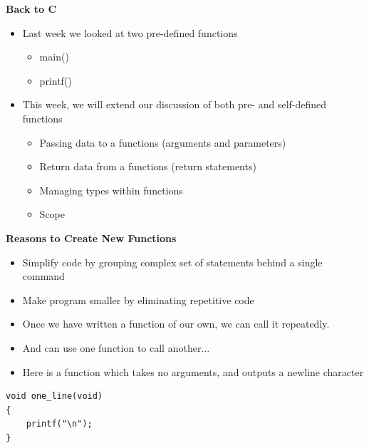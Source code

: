 \documentclass{beamer}
\begin{document}
\begin{frame}
 
\textbf{Back to C}
 

\begin{itemize}
\item Last week we looked at two pre-defined functions
\begin{itemize}
\item main() 
\item printf()
\end{itemize}
\item This week, we will extend our discussion of both pre- and self-defined functions

\begin{itemize}
\item Passing data to a functions (arguments and parameters)
\item Return data from a functions (return statements)
\item Managing types within functions
\item Scope
\end{itemize}
\end{itemize}
\end{frame}

\begin{frame}
 
\textbf{Reasons to Create New Functions}
 
\begin{itemize}
\item Simplify code by grouping complex set of statements behind a single command
\item Make program smaller by eliminating repetitive code 
\end{itemize}
\end{frame}

\begin{frame}
\begin{itemize}
\item Once we have written a function of our own, we can call it repeatedly. 
\item And can use one function to call another...
\end{itemize}
\end{frame}

\begin{frame}[fragile]
\begin{itemize}
\item Here is a function which takes no arguments, and outputs a newline character
\end{itemize}

\begin{block}{}
\begin{lstlisting}
void one_line(void)
{
    printf("\n");
}
\end{lstlisting}
\end{block}
\end{frame}
\end{document}
